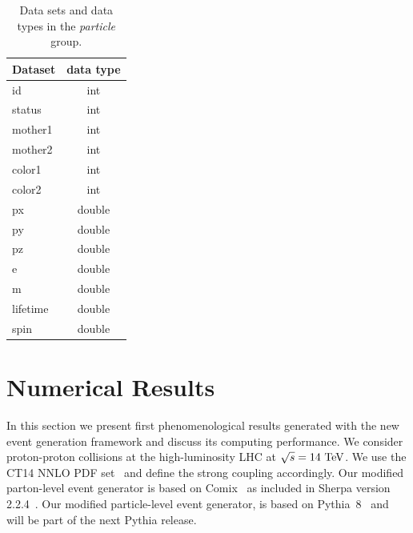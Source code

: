 \documentclass[aps,prd,twocolumn,fleqn,superscriptaddress,groupedaddress,nofootinbib,preprintnumbers]{revtex4}
\begin{document}
\begin{table}[t]
    \centering
    \begin{tabular}{lc}
        Dataset & data type \\ \toprule
        {\sc id}       & int    \\
        {\sc status}   & int    \\
        {\sc mother1}  & int    \\
        {\sc mother2}  & int    \\
        {\sc color1}   & int    \\
        {\sc color2}   & int    \\
        {\sc px}       & double \\
        {\sc py}       & double \\
        {\sc pz}       & double \\
        {\sc e}        & double \\
        {\sc m}        & double \\
        {\sc lifetime} & double \\
        {\sc spin}     & double \\ \bottomrule
    \end{tabular}
    \caption{\label{tab:group-particle} Data sets and data types in the {\it particle} group.}
\end{table}

\section{Numerical Results}
\label{sec:results}
In this section we present first phenomenological results
generated with the new event generation framework and discuss
its computing performance. We consider proton-proton collisions
at the high-luminosity LHC at $\sqrt{s}=14~{\rm TeV}$. We use
the CT14 NNLO PDF set~\cite{Dulat:2015mca} and define the strong
coupling accordingly. Our modified parton-level event generator
is based on Comix~\cite{Gleisberg:2008fv} as included in Sherpa
version 2.2.4~\cite{Gleisberg:2008ta}. Our modified particle-level
event generator, is based on Pythia~8~\cite{Sjostrand:2014zea} and will be part of the next Pythia release.
\end{document}
